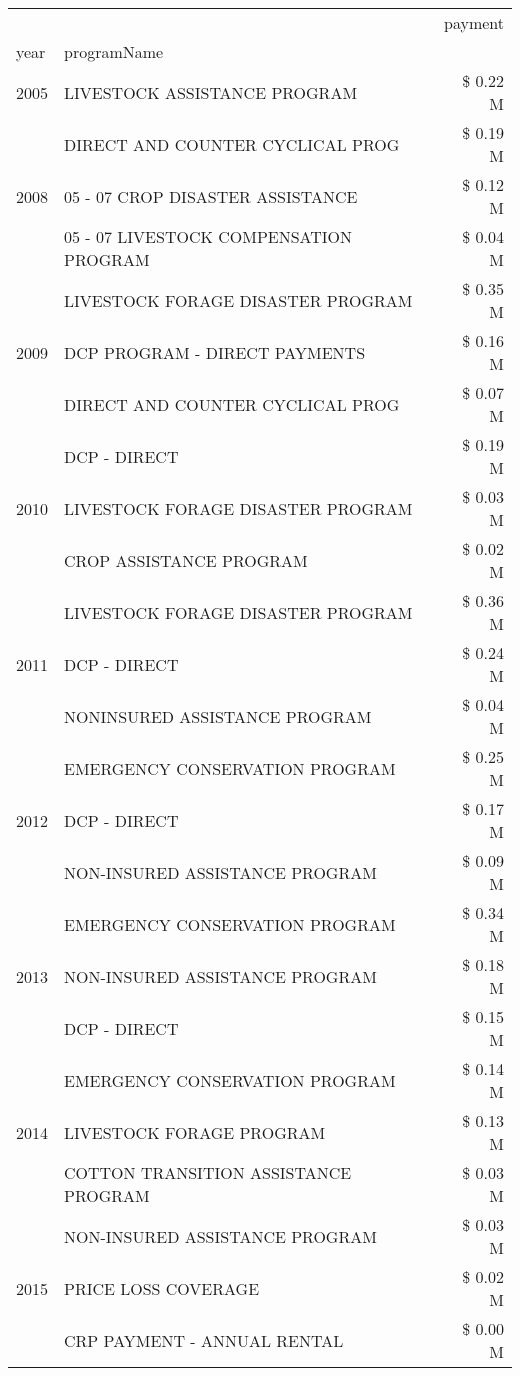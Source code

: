 \begin{tabular}{llr}
\toprule
 &  & payment \\
year & programName &  \\
\midrule
2005 & LIVESTOCK ASSISTANCE PROGRAM & \$ 0.22 M \\
\cline{1-3}
\multirow[t]{3}{*}{2008} & DIRECT AND COUNTER CYCLICAL PROG & \$ 0.19 M \\
 & 05 - 07 CROP DISASTER ASSISTANCE & \$ 0.12 M \\
 & 05 - 07 LIVESTOCK COMPENSATION PROGRAM & \$ 0.04 M \\
\cline{1-3}
\multirow[t]{3}{*}{2009} & LIVESTOCK FORAGE DISASTER  PROGRAM & \$ 0.35 M \\
 & DCP PROGRAM - DIRECT PAYMENTS & \$ 0.16 M \\
 & DIRECT AND COUNTER CYCLICAL PROG & \$ 0.07 M \\
\cline{1-3}
\multirow[t]{3}{*}{2010} & DCP - DIRECT & \$ 0.19 M \\
 & LIVESTOCK FORAGE DISASTER PROGRAM & \$ 0.03 M \\
 & CROP ASSISTANCE PROGRAM & \$ 0.02 M \\
\cline{1-3}
\multirow[t]{3}{*}{2011} & LIVESTOCK FORAGE DISASTER PROGRAM & \$ 0.36 M \\
 & DCP - DIRECT & \$ 0.24 M \\
 & NONINSURED ASSISTANCE PROGRAM & \$ 0.04 M \\
\cline{1-3}
\multirow[t]{3}{*}{2012} & EMERGENCY CONSERVATION PROGRAM & \$ 0.25 M \\
 & DCP - DIRECT & \$ 0.17 M \\
 & NON-INSURED ASSISTANCE PROGRAM & \$ 0.09 M \\
\cline{1-3}
\multirow[t]{3}{*}{2013} & EMERGENCY CONSERVATION PROGRAM & \$ 0.34 M \\
 & NON-INSURED ASSISTANCE PROGRAM & \$ 0.18 M \\
 & DCP - DIRECT & \$ 0.15 M \\
\cline{1-3}
\multirow[t]{3}{*}{2014} & EMERGENCY CONSERVATION PROGRAM & \$ 0.14 M \\
 & LIVESTOCK FORAGE PROGRAM & \$ 0.13 M \\
 & COTTON TRANSITION ASSISTANCE PROGRAM & \$ 0.03 M \\
\cline{1-3}
\multirow[t]{3}{*}{2015} & NON-INSURED ASSISTANCE PROGRAM & \$ 0.03 M \\
 & PRICE LOSS COVERAGE & \$ 0.02 M \\
 & CRP PAYMENT - ANNUAL RENTAL & \$ 0.00 M \\

\end{tabular}

